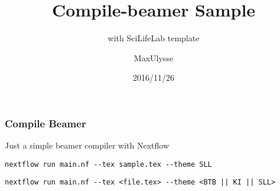 \documentclass{beamer}
\title{Compile-beamer Sample}
\subtitle{with SciLifeLab template}
\author{MaxUlysse}
\institute{Barntumörbanken / SciLifeLab}
\date{2016/11/26}
\begin{document}
	\begin{frame}
		\titlepage
	\end{frame}

	\begin{frame}[fragile]
		\frametitle{Compile Beamer}
		Just a simple beamer compiler with Nextflow
		\begin{lstlisting}[title=Usage]
			nextflow run main.nf --tex sample.tex --theme SLL
		\end{lstlisting}
		\begin{lstlisting}[title=This file was made using]
			nextflow run main.nf --tex <file.tex> --theme <BTB || KI || SLL>
		\end{lstlisting}
	\end{frame}
\end{document}
